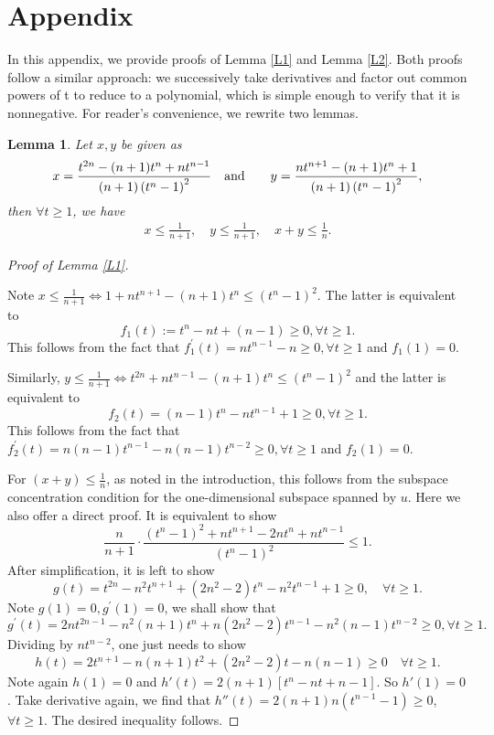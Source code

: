 \documentclass[12pt]{amsart}
\newtheorem{lemma}{Lemma}
\numberwithin{equation}{section}
\numberwithin{lemma}{section}
\numberwithin{proposition}{section}
\numberwithin{corollary}{section}
\numberwithin{remark}{section}
\begin{document}
\section{Appendix}
In this appendix, we provide proofs of Lemma \ref{L1} and Lemma \ref{L2}.
Both proofs follow a similar approach: we successively take derivatives and factor out common powers of t to reduce to a polynomial, which is simple enough to verify that it is nonnegative. For reader's convenience, we rewrite two lemmas. 

\begin{lemma} 
Let $x,y$ be given as 
\begin{align}\notag 
x=\frac{t^{2 n}-(n+1) t^n+n t^{n-1}}{(n+1)\left(t^n-1\right)^2} \quad \text{and} \quad  \quad y=\frac{n t^{n+1}-(n+1) t^n+1}{(n+1)\left(t^n-1\right)^2},
\end{align}
then $\forall t\geq 1$, we have 
\begin{align} \label{range}
    x\leq \frac{1}{n+1}, \quad y\leq \frac{1}{n+1}, \quad x+y\leq \frac{1}{n}.
\end{align}
\end{lemma}

\begin{proof}[Proof of Lemma \ref{L1}]
\ 

Note $x \leq \frac{1}{n+1} \Leftrightarrow 1+n t^{n+1}-(n+1) t^n \leq\left(t^n-1\right)^2$. The latter is equivalent to 
$$
f_1(t):=t^n-n t+(n-1) \geq 0, \forall t \geq 1. 
$$
This follows from the fact that $f_1^{\prime}(t)=n t^{n-1}-n \geq 0, \forall t \geq 1$ and $f_1(1)=0$.

Similarly,
$y \leq  \frac{1}{n+1} \Leftrightarrow t^{2 n}+n t^{n-1}-(n+1) t^n \leq\left(t^n-1\right)^2 $ and the latter is equivalent to 
$$
f_2(t)=(n-1) t^n-n t^{n-1}+1 \geq 0, \forall t \geq 1.
$$
This follows from the fact that $f_2^{\prime}(t)=n(n-1) t^{n-1}-n(n-1) t^{n-2} \geq 0, \forall t \geq 1$ and  $f_2(1)=0$.

For $ (x+y) \leq \frac{1}{n}$, as noted in the introduction, this follows from the subspace concentration condition for the one-dimensional subspace spanned by $u$. Here we also offer a direct proof. It is equivalent to show 
\[
 \frac{n}{n+1} \cdot \frac{\left(t^n-1\right)^2+n t^{n+1}-2 n t^n+n t^{n-1}}{\left(t^n-1\right)^2} \leq 1.
 \]
After simplification, it is left to show
\[
g(t)=  t^{2 n}-n^2 t^{n+1}+\left(2 n^2-2\right) t^n-n^2 t^{n-1}+1 \geq 0, \quad \forall t \geq 1.
\]
Note $g(1)=0, g^{\prime}(1)=0$, we shall show that 
\[
g^{\prime}(t)=2 n t^{2 n-1}-n^2(n+1) t^n+n\left(2 n^2-2\right) t^{n-1}
-n^2(n-1) t^{n-2} \geq 0, \forall t \geq 1.
\]
Dividing by $nt^{n-2}$, one just needs to show 
\[
h(t)=2t^{n+1}-n(n+1) t^2+(2n^2-2) t-n(n-1)\geq0 \quad \forall t\geq 1. 
\]
Note again $h(1)=0$ and $h'(t)=2(n+1)[t^n-nt+n-1]$. So $h'(1)=0$.  Take derivative again, we find that $h''(t)=2(n+1)n (t^{n-1}-1)\geq 0$, $\forall t\geq 1$. The desired inequality follows. 
\end{proof}
\end{document}
